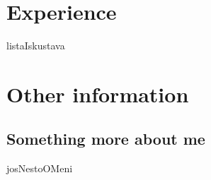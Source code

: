 \documentclass[letterpaper]{twentysecondcv} %
\begin{document}


\section{Experience}

\begin{twenty} %
	listaIskustava
	
\end{twenty}


\section{Other information}

\subsection{Something more about me}

josNestoOMeni
\end{document}

